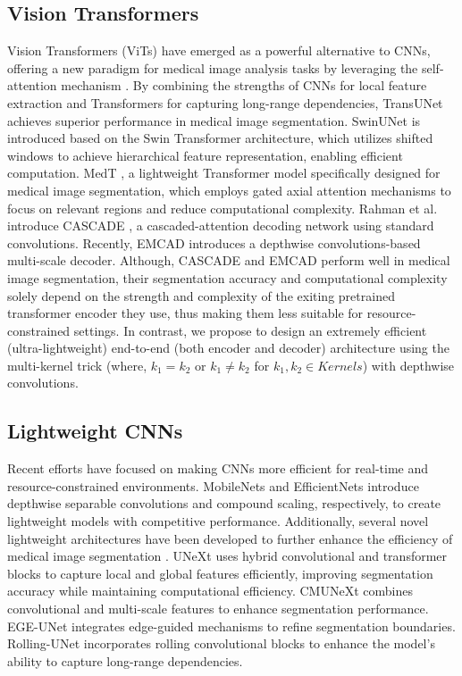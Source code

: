 \subsection{Vision Transformers}
Vision Transformers (ViTs) \cite{dosovitskiy2020image, liu2021swin} have emerged as a powerful alternative to CNNs, offering a new paradigm for medical image analysis tasks by leveraging the self-attention mechanism \cite{chen2021transunet, cao2021swin, rahman2024emcad, Rahman_2023_WACV, rahman2023multi, rahman2024g, valanarasu2021medical}. By combining the strengths of CNNs for local feature extraction and Transformers for capturing long-range dependencies, TransUNet \cite{chen2021transunet} achieves superior performance in medical image segmentation. SwinUNet \cite{cao2021swin} is introduced based on the Swin Transformer \cite{liu2021swin} architecture, which utilizes shifted windows to achieve hierarchical feature representation, enabling efficient computation. MedT \cite{valanarasu2021medical}, a lightweight Transformer model specifically designed for medical image segmentation, which employs gated axial attention mechanisms to focus on relevant regions and reduce computational complexity. Rahman et al. introduce CASCADE \cite{Rahman_2023_WACV}, a cascaded-attention decoding network using standard convolutions. Recently, EMCAD \cite{rahman2024emcad} introduces a depthwise convolutions-based multi-scale decoder. Although, CASCADE and EMCAD perform well in medical image segmentation, their segmentation accuracy and computational complexity solely depend on the strength and complexity of the exiting pretrained transformer encoder they use, thus making them less suitable for resource-constrained settings. In contrast, we propose to design an extremely efficient (ultra-lightweight) end-to-end (both encoder and decoder) architecture using the multi-kernel trick (where, $k_1=k_2$ or $k_1 \neq k_2$ for $k_1, k_2 \in Kernels$) with depthwise convolutions.

\subsection{Lightweight CNNs}
Recent efforts have focused on making CNNs more efficient for real-time and resource-constrained environments. MobileNets \cite{howard2017mobilenets} and EfficientNets \cite{tan2019efficientnet} introduce depthwise separable convolutions and compound scaling, respectively, to create lightweight models with competitive performance. Additionally, several novel lightweight architectures have been developed to further enhance the efficiency of medical image segmentation \cite{valanarasu2022unext, tang2023cmunext, ruan2023ege, liu2024rolling}. UNeXt \cite{valanarasu2022unext} uses hybrid convolutional and transformer blocks to capture local and global features efficiently, improving segmentation accuracy while maintaining computational efficiency. CMUNeXt \cite{tang2023cmunext} combines convolutional and multi-scale features to enhance segmentation performance. EGE-UNet \cite{ruan2023ege} integrates edge-guided mechanisms to refine segmentation boundaries. Rolling-UNet \cite{liu2024rolling} incorporates rolling convolutional blocks to enhance the model's ability to capture long-range dependencies.